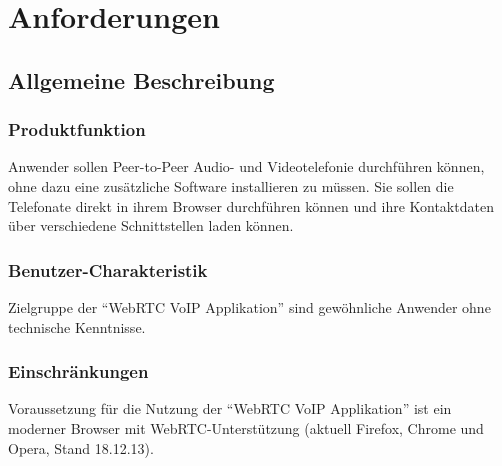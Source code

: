 \chapter{Anforderungen}
\section{Allgemeine Beschreibung}

\subsection{Produktfunktion}
Anwender sollen Peer-to-Peer Audio- und Videotelefonie durchführen können, ohne
dazu eine zusätzliche Software installieren zu müssen. Sie sollen die Telefonate
direkt in ihrem Browser durchführen können und ihre Kontaktdaten über
verschiedene Schnittstellen laden können.

\subsection{Benutzer-Charakteristik}
Zielgruppe der "`WebRTC VoIP Applikation"' sind gewöhnliche Anwender ohne
technische Kenntnisse.

\subsection{Einschränkungen}
Voraussetzung für die Nutzung der "`WebRTC VoIP Applikation"' ist ein moderner Browser mit
WebRTC-Unterstützung (aktuell Firefox, Chrome und Opera, Stand 18.12.13).

